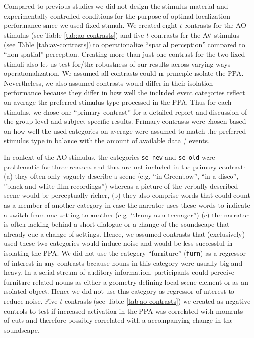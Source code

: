 \documentclass[english]{article}
\begin{document}
Compared to previous studies we did not design the stimulus material and
experimentally controlled conditions for the purpose of optimal localization
performance since we used fixed stimuli.
We created eight $t$-contrasts for the AO stimulus (see Table
\ref{tab:ao-contrasts}) and five $t$-contrasts for the AV stimulus (see Table
\ref{tab:av-contrasts}) to operationalize ``spatial perception'' compared to
``non-spatial'' perception.
Creating more than just one contrast for the two fixed stimuli also let us test
for/the robustness of our results across varying ways operationalization.
We assumed all contrasts could in principle isolate the PPA. Nevertheless, we
also assumed contrasts would differ in their isolation performance because they
differ in how well the included event categories reflect on average the
preferred stimulus type processed in the PPA.
Thus for each stimulus, we chose one ``primary contrast'' for a detailed report
and discussion of the group-level and subject-specific results. Primary
contrasts were chosen based on how well the used categories on average were
assumed to match the preferred stimulus type in balance with the amount of
available data / events.

In context of the AO stimulus, the categories \texttt{se\_new} and
\texttt{se\_old} were problematic for three reasons and thus are not included in
the primary contrast:
(a) they often only vaguely describe a scene (e.g. ``in Greenbow'', ``in a
disco'', ''black and white film recordings'') whereas a picture of the verbally
described scene would be perceptually richer,
(b) they also comprise words that could count as a member of another category in
case the narrator uses these words to indicate a switch from one setting to
another (e.g. ``Jenny as a teenager'')
(c) the narrator is often lacking behind a short dialogue or a change of the
soundscape that already cue a change of settings.
Hence, we assumed contrasts that (exclusively) used these two categories would
induce noise and would be less successful in isolating the PPA.
We did not use the category ``furniture'' (\texttt{furn}) as a regressor of
interest in any contrasts because nouns in this category were usually big and
heavy. In a serial stream of auditory information, participants could perceive
furniture-related nouns as either a geometry-defining local scene element or as
an isolated object. Hence we did not use this category as regressor of interest
to reduce noise.
Five $t$-contrasts (see Table \ref{tab:ao-contrasts}) we created as negative
controls to test if increased activation in the PPA was correlated with moments
of cuts and therefore possibly correlated with a accompanying change in the
soundscape.
\end{document}
